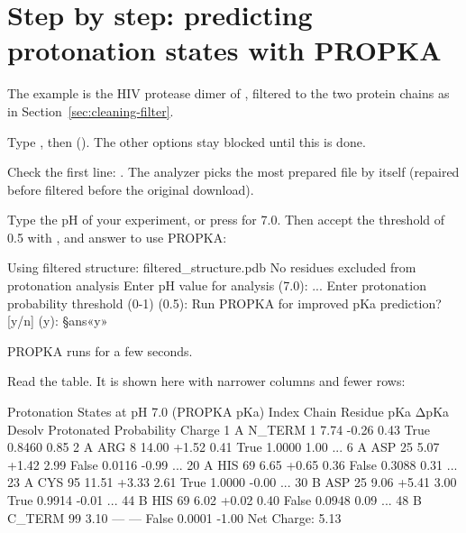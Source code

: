 \section{Step by step: predicting protonation states with PROPKA}
\label{sec:protonation-propka}

The example is the HIV protease dimer of , filtered to the two
protein chains as in Section~\ref{sec:cleaning-filter}.

\begin{steps}
  \item Type , then  (). The other options stay blocked until this is done.
  \item Check the first line: . The analyzer picks the most prepared file by
        itself (repaired before filtered before the original download).
  \item Type the pH of your experiment, or press  for 7.0. Then
        accept the threshold of 0.5 with , and answer  to
        use PROPKA:
\begin{screen}
Using filtered structure: filtered_structure.pdb
No residues excluded from protonation analysis
Enter pH value for analysis (7.0):
...
Enter protonation probability threshold (0-1) (0.5):
Run PROPKA for improved pKa prediction? [y/n] (y): §ans«y»
\end{screen}
        PROPKA runs for a few seconds.
  \item Read the table. It is shown here with narrower columns and fewer rows:
\begin{screen}
          Protonation States at pH 7.0 (PROPKA pKa)
Index Chain    Residue    pKa   ΔpKa Desolv Protonated Probability Charge
    1     A   N_TERM 1   7.74  -0.26   0.43       True      0.8460   0.85
    2     A      ARG 8  14.00  +1.52   0.41       True      1.0000   1.00
...
    6     A     ASP 25   5.07  +1.42   2.99      False      0.0116  -0.99
...
   20     A     HIS 69   6.65  +0.65   0.36      False      0.3088   0.31
...
   23     A     CYS 95  11.51  +3.33   2.61       True      1.0000  -0.00
...
   30     B     ASP 25   9.06  +5.41   3.00       True      0.9914  -0.01
...
   44     B     HIS 69   6.02  +0.02   0.40      False      0.0948   0.09
...
   48     B  C_TERM 99   3.10      —      —      False      0.0001  -1.00
Net Charge: 5.13
\end{screen}
\end{steps}

